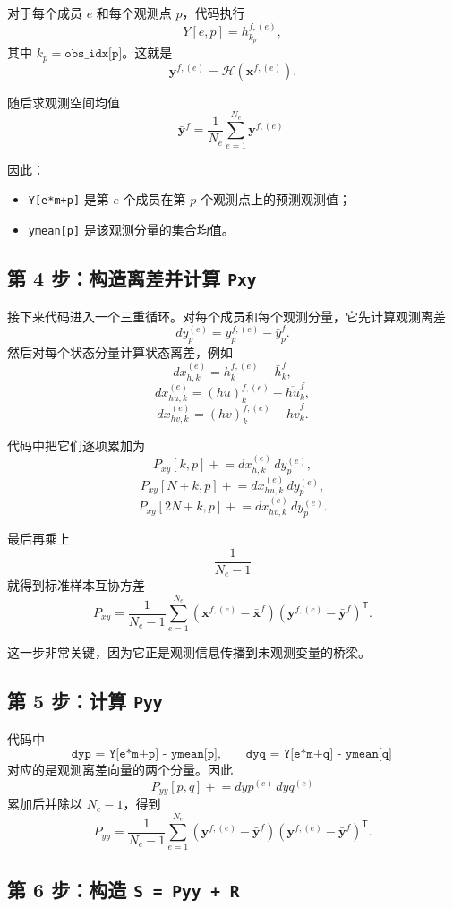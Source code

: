 \documentclass[12pt,a4paper]{article}
\begin{document}
对于每个成员 $e$ 和每个观测点 $p$，代码执行
\[
Y[e,p] = h^{f,(e)}_{k_p},
\]
其中 $k_p=\texttt{obs\_idx[p]}$。这就是
\[
\mathbf{y}^{f,(e)} = \mathcal{H}(\mathbf{x}^{f,(e)}).
\]

随后求观测空间均值
\[
\bar{\mathbf{y}}^f
= \frac{1}{N_e}\sum_{e=1}^{N_e}\mathbf{y}^{f,(e)}.
\]

因此：
\begin{itemize}
    \item \texttt{Y[e*m+p]} 是第 $e$ 个成员在第 $p$ 个观测点上的预测观测值；
    \item \texttt{ymean[p]} 是该观测分量的集合均值。
\end{itemize}

\subsection{第 4 步：构造离差并计算 \texttt{Pxy}}

接下来代码进入一个三重循环。对每个成员和每个观测分量，它先计算观测离差
\[
dy_p^{(e)} = y_p^{f,(e)} - \bar y_p^f.
\]
然后对每个状态分量计算状态离差，例如
\[
dx_{h,k}^{(e)} = h_k^{f,(e)} - \bar h_k^f,
\]
\[
dx_{hu,k}^{(e)} = (hu)_k^{f,(e)} - \overline{hu}_k^f,
\]
\[
dx_{hv,k}^{(e)} = (hv)_k^{f,(e)} - \overline{hv}_k^f.
\]

代码中把它们逐项累加为
\[
P_{xy}[k,p] \mathrel{+}= dx_{h,k}^{(e)}\,dy_p^{(e)},
\]
\[
P_{xy}[N+k,p] \mathrel{+}= dx_{hu,k}^{(e)}\,dy_p^{(e)},
\]
\[
P_{xy}[2N+k,p] \mathrel{+}= dx_{hv,k}^{(e)}\,dy_p^{(e)}.
\]

最后再乘上
\[
\frac{1}{N_e-1}
\]
就得到标准样本互协方差
\[
P_{xy}
= \frac{1}{N_e-1}
\sum_{e=1}^{N_e}
\left(\mathbf{x}^{f,(e)}-\bar{\mathbf{x}}^f\right)
\left(\mathbf{y}^{f,(e)}-\bar{\mathbf{y}}^f\right)^{\mathsf T}.
\]

这一步非常关键，因为它正是观测信息传播到未观测变量的桥梁。

\subsection{第 5 步：计算 \texttt{Pyy}}

代码中
\[
\texttt{dyp = Y[e*m+p] - ymean[p]},\qquad
\texttt{dyq = Y[e*m+q] - ymean[q]}
\]
对应的是观测离差向量的两个分量。因此
\[
P_{yy}[p,q] \mathrel{+}= dyp^{(e)}\,dyq^{(e)}
\]
累加后并除以 $N_e-1$，得到
\[
P_{yy}
= \frac{1}{N_e-1}
\sum_{e=1}^{N_e}
\left(\mathbf{y}^{f,(e)}-\bar{\mathbf{y}}^f\right)
\left(\mathbf{y}^{f,(e)}-\bar{\mathbf{y}}^f\right)^{\mathsf T}.
\]

\subsection{第 6 步：构造 \texttt{S = Pyy + R}}
\end{document}
